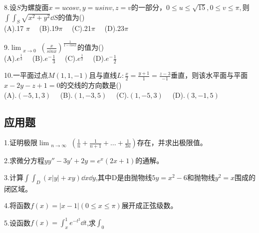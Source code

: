8.设$S$为螺旋面$x=ucosv,y=usinv,z=v$的一部分，$0\leqslant u \leqslant \sqrt{15},0 \leqslant v \leqslant \pi,$则$\int \int_{S} \sqrt{x^2+y^2} \dd{S}$的值为()\\
(A).17 $\pi \quad$ (B).19$ \pi \quad$ (C).21$ \pi \quad$  (D).23$ \pi \quad$

9.$\displaystyle \lim_{\substack{x \to 0}} (\frac{x}{sinx})^{\frac{1}{1-cosx}}$的值为()\\
(A).$e^\frac{1}{3}\quad$     (B).$e^-\frac{1}{3}\quad$    (C).$e^\frac{1}{2}\quad$      (D).$e^-\frac{1}{2}\quad$

10.一平面过点$M(1,1,-1)$且与直线$L:\frac{x}{2}=\frac{y+1}{1}=\frac{z-3}{-1}$垂直，则该水平面与平面$x-2y-z+1=0$的交线的方向数是()\\
(A).$(-5,1,3)\quad$  (B).$(1,-3,5)\quad$  (C).$(1,-5,3)\quad$   (D).$(3,-1,5)\quad$

\subsection{应用题}
1.证明极限$\displaystyle \lim_{\substack {n \to \infty}}(\frac{1}{n}+\frac{1}{n+1}+ \dots +\frac{1}{3n})$存在，并求出极限值。

2.求微分方程$yy''-3y'+2y=e^x(2x+1)$的通解。

3.计算$\int \int_{D}(x|y|+xy)\dd{x}\dd{y}$,其中D是由抛物线$5y=x^2-6$和抛物线$y^2=x$围成的闭区域。

4.将函数$f(x)=|x-1| (0\leqslant x \leqslant \pi)$展开成正弦级数。

5.设函数$f(x)=\int_{x}^{1}e^{-t^2}\dd{t}$,求$\int_{0}^{}$